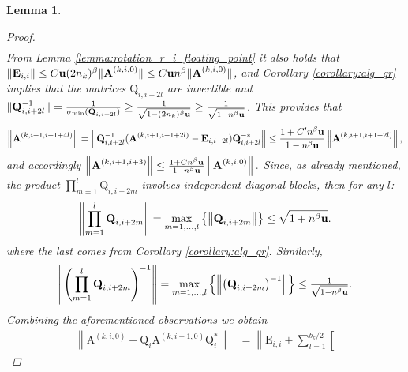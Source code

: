 \documentclass{article}
\newcommand{\lnorm}{\left\|}
\newcommand{\rnorm}{\right\|}
\newcommand{\lcurly}{\left\{}
\newcommand{\rcurly}{\right\}}
\newcommand{\lbrac}{\left[}
\newcommand{\lpar}{\left(}
\newcommand{\rpar}{\right)}
\newtheorem{lemma}{Lemma}[section]
\newcommand\matA{\boldsymbol{\mathrm{A}}}
\newcommand\matE{\boldsymbol{\mathrm{E}}}
\newcommand\matQ{\boldsymbol{\mathrm{Q}}}
\newcommand{\umach}{\textbf{\textup{u}}}
\newcommand{\cmm}{\beta}
\begin{document}
\begin{lemma}
\begin{proof}
\begin{align*}
        \end{align*}
        From Lemma \ref{lemma:rotation_r_i_floating_point} it also holds that $\|\matE_{i,i}\|\leq C\umach (2n_k)^{\cmm}\|\matA^{(k,i,0)}\|\leq C\umach n^{\cmm}\|\matA^{(k,i,0)}\|$, and
        Corollary \ref{corollary:alg_qr} implies that the matrices $\matQ_{i,i+2l}$ are invertible and 
        $\|\matQ_{i,i+2l}^{-1}\|=\frac{1}{\sigma_{\min}(\matQ_{i,i+2l})}\geq \frac{1}{\sqrt{1-(2n_k)^{\cmm}\umach}}\geq \frac{1}{\sqrt{1-n^{\cmm}\umach}}$. 
        This provides that
        \begin{align*}
            \lnorm \matA^{(k,i+1,i+1+4l)} \rnorm 
            =
            \lnorm 
            \matQ_{i,i+2l}^{-1} (\matA^{(k,i+1,i+1+2l)} -  \matE_{i,i+2l})\matQ_{i,i+2l}^{-*}
            \rnorm 
            \leq
            \frac{1+C'n^{\cmm}\umach }{1-n^{\cmm}\umach}
            \lnorm 
            \matA^{(k,i+1,i+1+2l)}
            \rnorm,
        \end{align*}
        and accordingly $\lnorm \matA^{(k,i+1,i+3)}\rnorm \leq \frac{1+Cn^{\cmm}\umach}{1-n^{\cmm}\umach}
        \lnorm
            \matA^{(k,i,0)}
        \rnorm.
        $
        Since, as already mentioned, the product $\prod_{m=1}^{l}\matQ_{i,i+2m}$ involves independent diagonal blocks, then for any $l$:
        \begin{align*}
            \lnorm
                \prod_{m=1}^{l}\matQ_{i,i+2m}
            \rnorm
            =
            \max_{m=1,\ldots,l}\lcurly
                \lnorm \matQ_{i,i+2m}\rnorm
            \rcurly 
            \leq
            \sqrt{1+n^{\cmm}\umach}.
        \end{align*}
        where the last comes from Corollary \ref{corollary:alg_qr}. Similarly,
        \begin{align*}
            \lnorm
                \lpar \prod_{m=1}^{l}\matQ_{i,i+2m} \rpar^{-1}
            \rnorm
            =
            \max_{m=1,\ldots,l}\lcurly
                \lnorm \lpar \matQ_{i,i+2m} \rpar ^{-1}\rnorm
            \rcurly 
            \leq
            \tfrac{1}{
            \sqrt{1-n^{\cmm}\umach}}.
        \end{align*}
        Combining the aforementioned observations we obtain
        \begin{align*}
            \lnorm
                \matA^{(k,i,0)}
                -
                \matQ_i\matA^{(k,i+1,0)}\matQ_i^*
            \rnorm
            &=
            \lnorm
                \matE_{i,i}
                +
                \sum_{l=1}^{b_k/2}
                \lbrac

\end{align*}
\end{proof}
\end{lemma}
\end{document}
